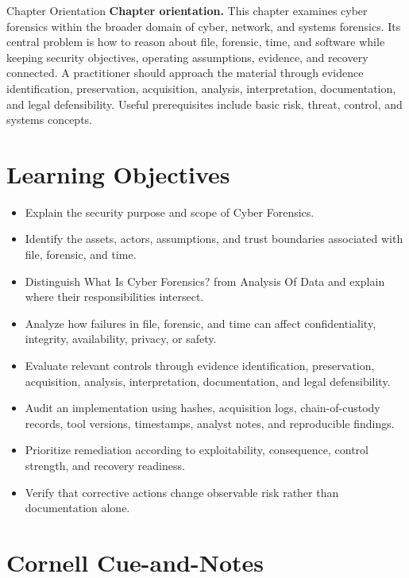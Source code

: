 \documentclass[11pt,letterpaper]{article}
\title{\CornellDocumentTitle}
\author{}
\date{}
\begin{document}
\maketitle
\begin{CornellOverviewBox}{Chapter Orientation}
\textbf{Chapter orientation.} This chapter examines cyber forensics within the broader domain of cyber, network, and systems forensics. Its central problem is how to reason about file, forensic, time, and software while keeping security objectives, operating assumptions, evidence, and recovery connected. A practitioner should approach the material through evidence identification, preservation, acquisition, analysis, interpretation, documentation, and legal defensibility. Useful prerequisites include basic risk, threat, control, and systems concepts.
\end{CornellOverviewBox}
\section*{Learning Objectives}
\begin{itemize}
\item Explain the security purpose and scope of Cyber Forensics.
\item Identify the assets, actors, assumptions, and trust boundaries associated with file, forensic, and time.
\item Distinguish What Is Cyber Forensics? from Analysis Of Data and explain where their responsibilities intersect.
\item Analyze how failures in file, forensic, and time can affect confidentiality, integrity, availability, privacy, or safety.
\item Evaluate relevant controls through evidence identification, preservation, acquisition, analysis, interpretation, documentation, and legal defensibility.
\item Audit an implementation using hashes, acquisition logs, chain-of-custody records, tool versions, timestamps, analyst notes, and reproducible findings.
\item Prioritize remediation according to exploitability, consequence, control strength, and recovery readiness.
\item Verify that corrective actions change observable risk rather than documentation alone.
\end{itemize}
\section*{Cornell Cue-and-Notes}
\end{document}
